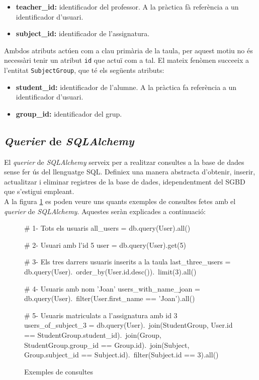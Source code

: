   	\begin{itemize}
   		\item \textbf{teacher\_id:} identificador del professor. A la pràctica fà referència a un identificador d'usuari.
   		\item \textbf{subject\_id:} identificador de l'assignatura.
   	\end{itemize}
   	
   	Ambdos atributs actúen com a clau primària de la taula, per aquest motiu no és necessàri tenir un atribut \texttt{id} que actuï com a tal. El mateix fenòmen succeeix a l'entitat \texttt{SubjectGroup}, que té els següents atributs:
   	
   	\begin{itemize}
   		\item \textbf{student\_id:} identificador de l'alumne. A la pràctica fa referència a un identificador d'usuari.
   		\item \textbf{group\_id:} identificador del grup.
   	\end{itemize}
   	   
   \subsection{\emph{Querier} de \emph{SQLAlchemy}}
   
   El \emph{querier} de \emph{SQLAlchemy} serveix per a realitzar consultes a la base de dades sense fer ús del llenguatge \ac{SQL}. Definiex una manera abstracta d'obtenir, inserir, actualitzar i eliminar registres de la base de dades, idependentment del \ac{SGBD} que s'estigui empleant. \\
  
	A la figura \ref{fig:exemples_consultes} es poden veure uns quants exemples de consultes fetes amb el \emph{querier} de \emph{SQLAlchemy}. Aquestes seràn explicades a continuació:

\begin{figure}
  	\begin{python}
# 1- Tots els usuaris
all_users = db.query(User).all()

# 2- Usuari amb l'id 5
user = db.query(User).get(5)

# 3- Els tres darrers usuaris inserits a la taula 
last_three_users = db.query(User).\
				order_by(User.id.desc()).\
				limit(3).all()

# 4- Usuaris amb nom 'Joan'
users_with_name_joan = db.query(User).\
				filter(User.first_name == 'Joan').all()
											
# 5- Usuaris matriculats a l'assignatura amb id 3
users_of_subject_3 = db.query(User).\
				join(StudentGroup, User.id == StudentGroup.student_id).\
				join(Group, StudentGroup.group_id == Group.id).\
				join(Subject, Group.subject_id == Subject.id).\
				filter(Subject.id == 3).all()
				
	\end{python}
	\caption{Exemples de consultes}
	\label{fig:exemples_consultes}
\end{figure}

